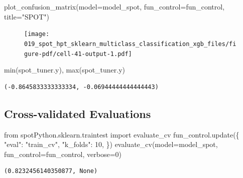 \documentclass[
  letterpaper,
  DIV=11,
  numbers=noendperiod]{scrreprt}
\newenvironment{Shaded}{\begin{snugshade}}{\end{snugshade}}
\newcommand{\BuiltInTok}[1]{\textcolor[rgb]{0.00,0.23,0.31}{#1}}
\newcommand{\DecValTok}[1]{\textcolor[rgb]{0.68,0.00,0.00}{#1}}
\newcommand{\ImportTok}[1]{\textcolor[rgb]{0.00,0.46,0.62}{#1}}
\newcommand{\NormalTok}[1]{\textcolor[rgb]{0.00,0.23,0.31}{#1}}
\newcommand{\OperatorTok}[1]{\textcolor[rgb]{0.37,0.37,0.37}{#1}}
\newcommand{\StringTok}[1]{\textcolor[rgb]{0.13,0.47,0.30}{#1}}
\begin{document}
\begin{Shaded}
\begin{Highlighting}[]
\NormalTok{plot\_confusion\_matrix(model}\OperatorTok{=}\NormalTok{model\_spot, fun\_control}\OperatorTok{=}\NormalTok{fun\_control, title}\OperatorTok{=}\StringTok{"SPOT"}\NormalTok{)}
\end{Highlighting}
\end{Shaded}

\begin{figure}[H]

{\centering \texttt{[image: 019\_spot\_hpt\_sklearn\_multiclass\_classification\_xgb\_files/figure-pdf/cell-41-output-1.pdf]}

}

\end{figure}

\begin{Shaded}
\begin{Highlighting}[]
\BuiltInTok{min}\NormalTok{(spot\_tuner.y), }\BuiltInTok{max}\NormalTok{(spot\_tuner.y)}
\end{Highlighting}
\end{Shaded}

\begin{verbatim}
(-0.8645833333333334, -0.06944444444444443)
\end{verbatim}

\hypertarget{cross-validated-evaluations-1}{%
\subsection{Cross-validated
Evaluations}\label{cross-validated-evaluations-1}}

\begin{Shaded}
\begin{Highlighting}[]
\ImportTok{from}\NormalTok{ spotPython.sklearn.traintest }\ImportTok{import}\NormalTok{ evaluate\_cv}
\NormalTok{fun\_control.update(\{}
     \StringTok{"eval"}\NormalTok{: }\StringTok{"train\_cv"}\NormalTok{,}
     \StringTok{"k\_folds"}\NormalTok{: }\DecValTok{10}\NormalTok{,}
\NormalTok{\})}
\NormalTok{evaluate\_cv(model}\OperatorTok{=}\NormalTok{model\_spot, fun\_control}\OperatorTok{=}\NormalTok{fun\_control, verbose}\OperatorTok{=}\DecValTok{0}\NormalTok{)}
\end{Highlighting}
\end{Shaded}

\begin{verbatim}
(0.8232456140350877, None)
\end{verbatim}
\end{document}
